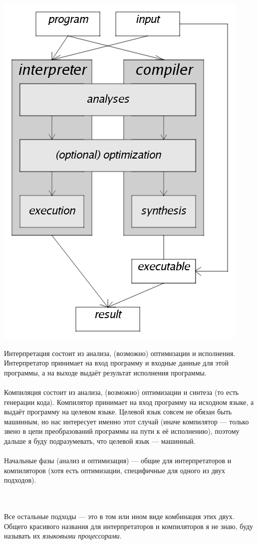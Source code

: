 \documentclass[11pt]{book}
\begin{document}
\begin{minipage}{0.4\textwidth}
\includegraphics[width=\textwidth]{pic/interpreter_compiler.png}
\end{minipage}
\begin{minipage}{0.6\textwidth}
Интерпретация состоит из анализа, (возможно) оптимизации и исполнения.
Интерпретатор принимает на вход программу и входные данные для этой программы,
а на выходе выдаёт результат исполнения программы.
\\ \\
Компиляция состоит из анализа, (возможно) оптимизации и синтеза (то есть генерации кода).
Компилятор принимает на вход программу на исходном языке, а выдаёт программу на целевом языке.
Целевой язык совсем не обязан быть машинным, но нас интересует именно этот случай
(иначе компилятор --- только звено в цепи преобразований программы на пути к её исполнению),
поэтому дальше я буду подразумевать, что целевой язык --- машинный.
\\ \\
Начальные фазы (анализ и оптимизация) --- общие для интерпретаторов и компиляторов
(хотя есть оптимизации, специфичные для одного из двух подходов).
\end{minipage}
\\ \\
Все остальные подходы --- это в том или ином виде комбинация этих двух.
Общего красивого названия для интерпретаторов и компиляторов я не знаю, буду называть их \emph{языковыми процессорами}.
\end{document}
